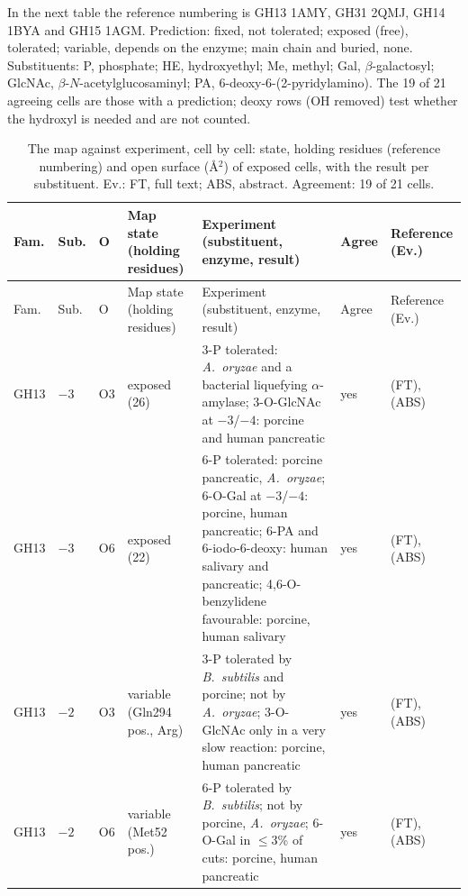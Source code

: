 \documentclass[preprint,12pt]{elsarticle}
\begin{document}
\begin{landscape}
{\scriptsize\renewcommand{\baselinestretch}{1}\renewcommand{\arraystretch}{0.92}\setlength{\tabcolsep}{2pt}
In the next table the reference numbering is GH13 1AMY, GH31 2QMJ, GH14 1BYA and GH15 1AGM. Prediction: fixed, not tolerated; exposed (free), tolerated; variable, depends on the enzyme; main chain and buried, none. Substituents: P, phosphate; HE, hydroxyethyl; Me, methyl; Gal, $\beta$-galactosyl; GlcNAc, $\beta$-$N$-acetylglucosaminyl; PA, 6-deoxy-6-(2-pyridylamino). The 19 of 21 agreeing cells are those with a prediction; deoxy rows (OH removed) test whether the hydroxyl is needed and are not counted.

\begin{longtable}{lllp{3.3cm}p{6.8cm}lp{3.8cm}}
\caption{The map against experiment, cell by cell: state, holding residues (reference numbering) and open surface (\AA$^2$) of exposed cells, with the result per substituent. Ev.: FT, full text; ABS, abstract. Agreement: 19 of 21 cells.}
\label{tab:mapexp}\\
\toprule
Fam. & Sub. & O & Map state (holding residues) & Experiment (substituent, enzyme, result) & Agree & Reference (Ev.)\\
\midrule
\endfirsthead
\toprule
Fam. & Sub. & O & Map state (holding residues) & Experiment (substituent, enzyme, result) & Agree & Reference (Ev.)\\
\midrule
\endhead
\bottomrule
\endfoot
GH13 & $-3$ & O3 & exposed (26) & 3-P tolerated: \emph{A.~oryzae} and a bacterial liquefying $\alpha$-amylase; 3-O-GlcNAc at $-3$/$-4$: porcine and human pancreatic & yes & \citep{Takeda1987,Okada2000} (FT), \citep{TakedaHizukuri1986,Kamasaka1997} (ABS)\\
GH13 & $-3$ & O6 & exposed (22) & 6-P tolerated: porcine pancreatic, \emph{A.~oryzae}; 6-O-Gal at $-3$/$-4$: porcine, human pancreatic; 6-PA and 6-iodo-6-deoxy: human salivary and pancreatic; 4,6-O-benzylidene favourable: porcine, human salivary & yes & \citep{Takeda1987,Okada2000,Omichi1988} (FT), \citep{Takeda1983,Omichi1992,Kandra1997,Kandra2000} (ABS)\\
GH13 & $-2$ & O3 & variable (Gln294 pos., Arg) & 3-P tolerated by \emph{B.~subtilis} and porcine; not by \emph{A.~oryzae}; 3-O-GlcNAc only in a very slow reaction: porcine, human pancreatic & yes & \citep{Takeda1987,Okada2000} (FT), \citep{Takeda1983,TakedaHizukuri1986} (ABS)\\
GH13 & $-2$ & O6 & variable (Met52 pos.) & 6-P tolerated by \emph{B.~subtilis}; not by porcine, \emph{A.~oryzae}; 6-O-Gal in $\le$3\% of cuts: porcine, human pancreatic & yes & \citep{Takeda1987,Okada2000} (FT), \citep{Takeda1983,TakedaHizukuri1986} (ABS)\\

\end{longtable}}
\end{landscape}
\end{document}

